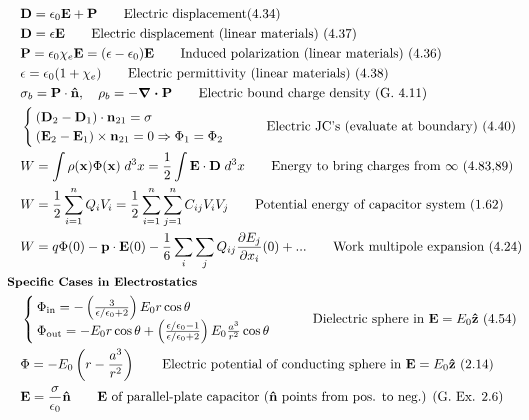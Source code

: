 \documentclass[10pt]{article}
\newcommand{\zhat}{\boldsymbol{\hat{\textbf{z}}}}
\newcommand{\nhat}{\boldsymbol{\hat{\textbf{n}}}}
\newcommand{\ve}[1]{\boldsymbol{\mathbf{#1}}}
\newcommand{\vect}[1]{\boldsymbol{\mathbf{#1}}}
\newcommand{\eo}{\epsilon_0}
\newcommand{\pder}[2]{\frac{\partial #1}{\partial #2}}
\begin{document}
\begin{multicols}{2}
\begin{align*}
		& \vect{D} = \eo \vect{E} + \vect{P} \tag*{Electric displacement(4.34)} \\
		& \vect{D} = \epsilon \vect{E} \tag*{Electric displacement (linear materials) (4.37)} \\
		& \vect{P} = \eo \chi_e \vect{E} = (\epsilon - \eo) \ve{E} \tag*{Induced polarization (linear materials) (4.36)} \\
		& \epsilon = \eo (1 + \chi_e) \tag*{Electric permittivity (linear materials) (4.38)} \\
		& \sigma_b = \ve{P} \cdot \nhat, \quad \rho_b = - \ve{\nabla \cdot P} \tag*{Electric bound charge density (G. 4.11)} \\
		& \begin{cases}
			(\vect{D}_2 - \vect{D}_1) \cdot \vect{n}_{21} = \sigma \\
			(\vect{E}_2 - \vect{E}_1) \times \vect{n}_{21} = 0 \Rightarrow \Phi_1 = \Phi_2 \\
		\end{cases}	\tag*{Electric JC's (evaluate at boundary) (4.40)} \\		
		& W = \int \rho(\vect{x}) \Phi(\vect{x})\; d^3x = \frac{1}{2} \int \vect{E} \cdot \vect{D} \; d^3x \tag*{Energy to bring charges from $\infty$ (4.83,89)} \\
		& W = \frac{1}{2} \sum_{i=1}^{n} Q_i V_i = \frac{1}{2} \sum_{i=1}^n \sum_{j=1}^{n} C_{ij} V_i V_j	\tag*{Potential energy of capacitor system (1.62)} \\	
		& W = q \Phi(0) - \vect{p} \cdot \vect{E}(0) - \frac{1}{6} \sum_i \sum_j Q_{ij} \pder{E_j}{x_i}(0) + ... \tag*{Work multipole expansion (4.24)} \\
	& \small \hspace{-10pt} \textbf{Specific Cases in Electrostatics} \small \\
		&\begin{cases}
			\Phi_{\text{in}} = - \left( \frac{3}{\epsilon/\eo + 2} \right) E_0 r \cos \theta \\ 
			\Phi_{\text{out}} = - E_0 r \cos \theta + \left( \frac{\epsilon/\eo - 1}{\epsilon/\eo + 2} \right) E_0 \frac{a^3}{r^2} \cos \theta 
		\end{cases} \tag*{Dielectric sphere in $\vect{E} = E_0 \zhat$ (4.54)} \\
		& \Phi = -E_0 \left( r - \frac{a^3}{r^2} \right)	\tag*{Electric potential of conducting sphere in $\vect{E} = E_0 \zhat$ (2.14)} \\
		& \ve{E} = \frac{\sigma}{\eo} \nhat \tag*{$\ve{E}$ of parallel-plate capacitor ($\nhat$ points from pos. to neg.) (G. Ex. 2.6)} \\

\end{align*}
\end{multicols}
\end{document}
